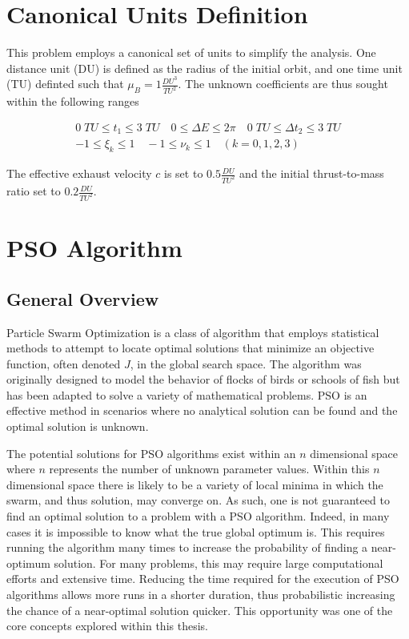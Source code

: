 \section{Canonical Units Definition}

This problem employs a canonical set of units to simplify the analysis. One distance unit (DU) is defined as the radius of the initial orbit,
and one time unit (TU) definted such that $\mu_B = 1 \frac{DU^3}{TU^2}$. The unknown coefficients are thus sought within the following ranges

\begin{equation}
\label{particleBounds}
\begin{gathered}
0 \; TU \leq t_1 \leq 3 \; TU \quad 0 \leq \Delta E \leq 2\pi \quad 0 \; TU \leq \Delta t_2 \leq 3 \; TU \\
-1 \leq \xi_k \leq 1 \quad -1 \leq \nu_k \leq 1 \quad (k = 0,1,2,3)
\end{gathered}
\end{equation}

\noindent The effective exhaust velocity $c$ is set to $0.5 \frac{DU}{TU^2}$ and the initial thrust-to-mass ratio set to $0.2 \frac{DU}{TU^2}$. 

\section{PSO Algorithm}

\subsection{General Overview}
Particle Swarm Optimization is a class of algorithm that employs statistical methods to attempt to locate optimal solutions 
that minimize an objective function, often denoted $J$, in the global search space. The algorithm was originally designed to model
the behavior of flocks of birds or schools of fish but has been adapted to solve a variety of mathematical problems. PSO is an effective method in scenarios where no analytical solution can be found and the optimal solution is unknown. \newline

The potential solutions for PSO algorithms exist within an $n$ dimensional space where $n$ represents the number of unknown parameter values. Within this $n$ dimensional space there is likely to 
be a variety of local minima in which the swarm, and thus solution, may converge on. As such, one is not guaranteed to find an optimal solution to a problem with a PSO algorithm. Indeed, in many
cases it is impossible to know what the true global optimum is. This requires running the algorithm many times to increase the probability of finding a near-optimum solution. 
For many problems, this may require large computational efforts and extensive time. Reducing the time required for the execution of PSO algorithms allows more runs in a shorter duration,
thus probabilistic increasing the chance of a near-optimal solution quicker. This opportunity was one of the core concepts explored within this thesis.  \newline

